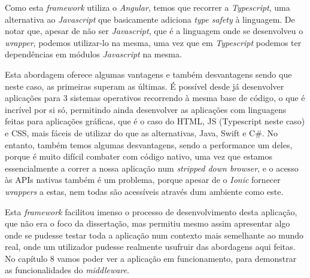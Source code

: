 Como esta \textit{framework} utiliza o \textit{Angular}, temos que recorrer a \textit{Typescript}, uma alternativa ao \textit{Javascript} que basicamente adiciona \textit{type safety} à linguagem. De notar que, apesar de não ser \textit{Javascript}, que é a linguagem onde se desenvolveu o \textit{wrapper}, podemos utilizar-lo na mesma, uma vez que em \textit{Typescript} podemos ter dependências em módulos \textit{Javascript} na mesma.

Esta abordagem oferece algumas vantagens e também desvantagens sendo que neste caso, as primeiras superam as últimas. É possível desde já desenvolver aplicações para 3 sistemas operativos recorrendo à mesma base de código, o que é incrível por si só, permitindo ainda desenvolver as aplicações com linguagens feitas para aplicações gráficas, que é o caso do HTML, JS (Typescript neste caso) e CSS, mais fáceis de utilizar do que as alternativas, Java, Swift e C\#. No entanto, também temos algumas desvantagens, sendo a performance um deles, porque é muito difícil combater com código nativo, uma vez que estamos essencialmente a correr a nossa aplicação num \textit{stripped down browser}, e o acesso às APIs nativas também é um problema, porque apesar de o \textit{Ionic} fornecer \textit{wrappers} a estas, nem todas são acessíveis através dum ambiente como este.

Esta \textit{framework} facilitou imenso o processo de desenvolvimento desta aplicação, que não era o foco da dissertação, mas permitiu mesmo assim apresentar algo onde se pudesse testar toda a aplicação num contexto mais semelhante ao mundo real, onde um utilizador pudesse realmente usufruir das abordagens aqui feitas. No capítulo 8 vamos poder ver a aplicação em funcionamento, para demonstrar as funcionalidades do \textit{middleware}.